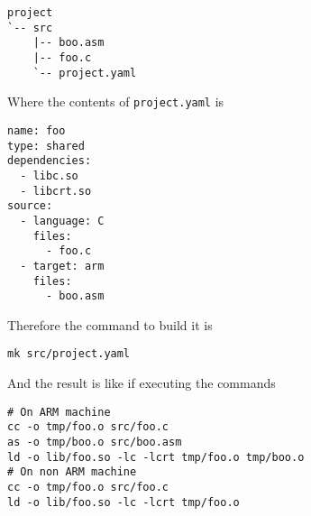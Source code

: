 \documentclass[
   article,                      %
   10pt,                         %
   openright,                    %
   oneside,                      %
   a4paper,                      %
   sumario = tradicional,        %
   english,                      %
   xcolor=table                  %
]{abntex2}
\begin{document}
\begin{lstlisting}
project
`-- src
    |-- boo.asm
    |-- foo.c
    `-- project.yaml
\end{lstlisting}

Where the contents of \texttt{project.yaml} is

\begin{lstlisting}[style=yaml]
name: foo
type: shared
dependencies:
  - libc.so
  - libcrt.so
source:
  - language: C
    files:
      - foo.c
  - target: arm
    files:
      - boo.asm
\end{lstlisting}

\noindent
Therefore the command to build it is

\begin{lstlisting}[style=bash]
mk src/project.yaml
\end{lstlisting}

\noindent
And the result is like if executing the commands

\begin{lstlisting}[style=bash]
# On ARM machine
cc -o tmp/foo.o src/foo.c
as -o tmp/boo.o src/boo.asm
ld -o lib/foo.so -lc -lcrt tmp/foo.o tmp/boo.o
# On non ARM machine
cc -o tmp/foo.o src/foo.c
ld -o lib/foo.so -lc -lcrt tmp/foo.o
\end{lstlisting}
\end{document}
